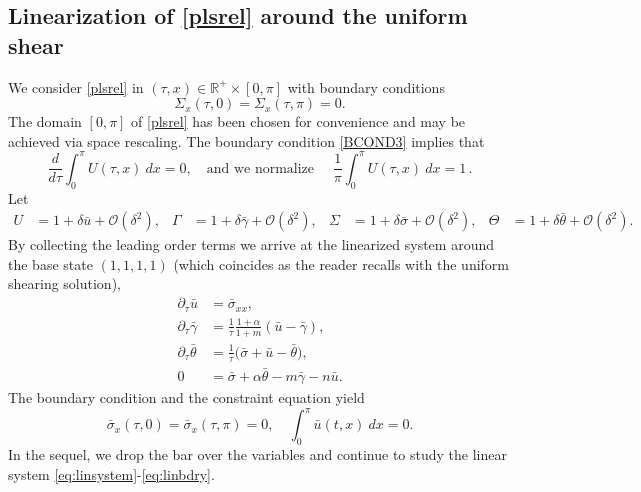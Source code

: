 \documentclass[a4paper,11pt]{article}
\theoremstyle{remark}
\begin{document}
\subsection{Linearization of \eqref{plsrel} around the uniform shear}

We consider \eqref{plsrel}
in $(\tau,x)\in \mathbb{R}^+\times [0,\pi]$ with boundary conditions
\begin{equation} \label{BCOND3}
 \Sigma_x(\tau,0)=\Sigma_x(\tau,\pi)=0.
\end{equation}
The domain $[0,\pi]$ of \eqref{plsrel} has been chosen for convenience and may be achieved via space rescaling.
The boundary condition \eqref{BCOND3} implies that
\begin{equation*}
 \frac{d}{d\tau}\int_0^\pi U(\tau,x) \: dx = 0, \quad \text{and we normalize } \quad  \frac{1}{\pi} \int_0^\pi U(\tau,x) \: dx = 1 \, .
\end{equation*}
Let
\begin{align*}
 U &= 1 + \delta \bar{u} + \mathcal{O}(\delta^2), & \Gamma &= 1 + \delta \bar\gamma + \mathcal{O}(\delta^2), &
 \Sigma &= 1 + \delta \bar\sigma + \mathcal{O}(\delta^2), & \Theta &= 1 + \delta \bar\theta + \mathcal{O}(\delta^2).
\end{align*}
By collecting the leading order terms we arrive at the linearized system around the base state $(1,1,1,1)$ (which coincides as the
reader recalls with the uniform shearing solution),
\begin{equation} \label{eq:linsystem}
 \begin{aligned}
  \partial_\tau \bar u &= \bar\sigma_{xx},\\
  \partial_\tau \bar\gamma &= \frac{1}{\tau}\frac{1+\alpha}{1+m}(\bar u-\bar\gamma),\\
  \partial_\tau \bar\theta &= \frac{1}{\tau}\Big(\bar\sigma+ \bar u -\bar\theta\Big),\\ %
  0&=\bar\sigma + \alpha\bar\theta -m\bar\gamma - n\bar u .
 \end{aligned}
\end{equation}
The boundary condition and the constraint equation yield
\begin{equation} \label{eq:linbdry}
 \bar\sigma_{x}(\tau,0)=\bar\sigma_{x}(\tau,\pi)=0, \quad \int_0^\pi \bar u(t,x) \: dx = 0.
\end{equation}
In the sequel, we drop the bar over the variables and continue to study the linear system \eqref{eq:linsystem}-\eqref{eq:linbdry}.
\end{document}
